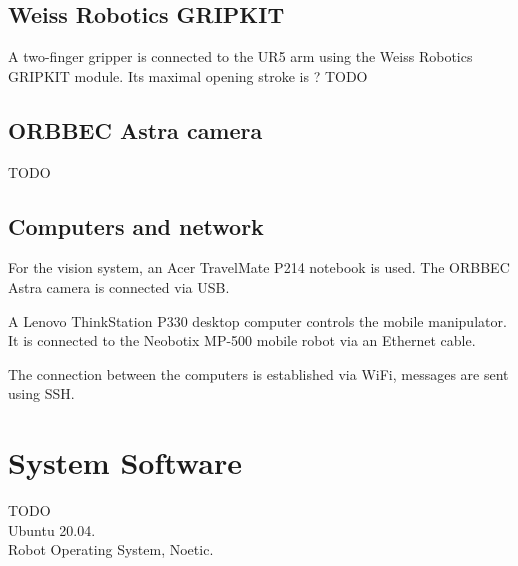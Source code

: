 \subsection{Weiss Robotics GRIPKIT}

A two-finger gripper is connected to the UR5 arm using the Weiss Robotics GRIPKIT module. Its maximal opening stroke is ? TODO \par

\subsection{ORBBEC Astra camera}
TODO \\

\subsection{Computers and network}
For the vision system, an Acer TravelMate P214 notebook is used. The ORBBEC Astra camera is connected via USB.\par
A Lenovo ThinkStation P330 desktop computer controls the mobile manipulator. It is connected to the Neobotix MP-500 mobile robot via an Ethernet cable.\par
The connection between the computers is established via WiFi, messages are sent using SSH.\par

\section{System Software}
TODO\\
Ubuntu 20.04.\\
Robot Operating System, Noetic.\\
